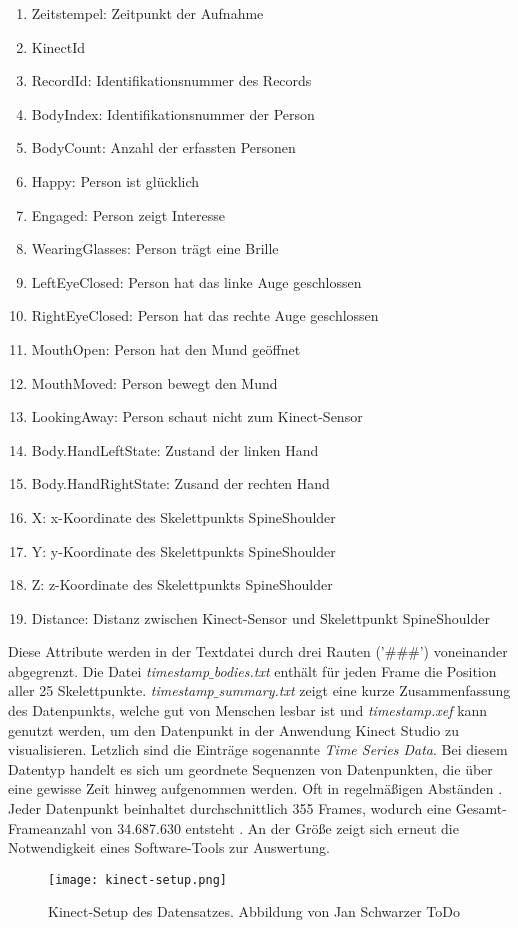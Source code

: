 \begin{enumerate}
  \item Zeitstempel: Zeitpunkt der Aufnahme
  \item KinectId
  \item RecordId: Identifikationsnummer des Records
  \item BodyIndex: Identifikationsnummer der Person
  \item BodyCount: Anzahl der erfassten Personen
  \item Happy: Person ist glücklich
  \item Engaged: Person zeigt Interesse
  \item WearingGlasses: Person trägt eine Brille
  \item LeftEyeClosed: Person hat das linke Auge geschlossen
  \item RightEyeClosed: Person hat das rechte Auge geschlossen
  \item MouthOpen: Person hat den Mund geöffnet
  \item MouthMoved: Person bewegt den Mund
  \item LookingAway: Person schaut nicht zum Kinect-Sensor
  \item Body.HandLeftState: Zustand der linken Hand
  \item Body.HandRightState: Zusand der rechten Hand
  \item X: x-Koordinate des Skelettpunkts SpineShoulder
  \item Y: y-Koordinate des Skelettpunkts SpineShoulder
  \item Z: z-Koordinate des Skelettpunkts SpineShoulder
  \item Distance: Distanz zwischen Kinect-Sensor und Skelettpunkt SpineShoulder
\end{enumerate}

Diese Attribute werden in der Textdatei durch drei Rauten ('\#\#\#') voneinander abgegrenzt.
Die Datei \emph{timestamp$\_$bodies.txt} enthält für jeden Frame die Position aller 25 Skelettpunkte.
\emph{timestamp$\_$summary.txt} zeigt eine kurze Zusammenfassung des Datenpunkts, welche gut von Menschen lesbar ist
und \emph{timestamp.xef} kann genutzt werden, um den Datenpunkt in der Anwendung Kinect Studio zu visualisieren.
Letzlich sind die Einträge sogenannte \emph{Time Series Data}.
Bei diesem Datentyp handelt es sich um geordnete Sequenzen von Datenpunkten,
die über eine gewisse Zeit hinweg aufgenommen werden.
Oft in regelmäßigen Abständen \citep{ali_clustering_2019}.
Jeder Datenpunkt beinhaltet durchschnittlich 355 Frames,
wodurch eine Gesamt-Frameanzahl von 34.687.630 entsteht \citep{temiz_konzeption_2022}.
An der Größe zeigt sich erneut die Notwendigkeit eines Software-Tools zur Auswertung.

\begin{figure}[ht]
  \begin{center}
  \texttt{[image: kinect-setup.png]}
  \end{center}
  \caption{Kinect-Setup des Datensatzes. Abbildung von Jan Schwarzer ToDo} %
  \label{fig:KinectSetup}
\end{figure}